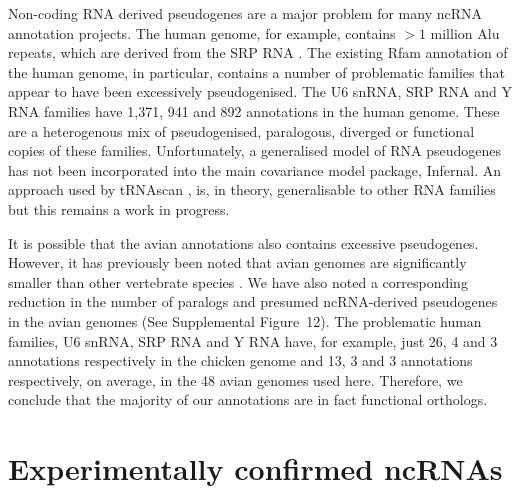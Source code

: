 \documentclass[10pt]{bmc_article}
\newenvironment{bmcformat}{\begin{raggedright}\baselineskip20pt\sloppy\setboolean{publ}{false}}{\end{raggedright}\baselineskip20pt\sloppy}
\begin{document}
\begin{bmcformat}

Non-coding RNA derived pseudogenes are a major problem for many ncRNA
annotation projects. The human genome, for example, contains $>1$
million Alu repeats, which are derived from the SRP RNA
\cite{Wheeler:2013}. The existing Rfam annotation of the human genome,
in particular, contains a number of problematic families that appear
to have been excessively pseudogenised. The U6 snRNA, SRP RNA and Y
RNA families have 1,371, 941 and 892 annotations in the human
genome. These are a heterogenous mix of pseudogenised, paralogous,
diverged or functional copies of these families. Unfortunately, a
generalised model of RNA pseudogenes has not been incorporated into
the main covariance model package, Infernal. An approach used by tRNAscan
\cite{Lowe:1997}, is, in theory, generalisable to other RNA families
but this remains a work in progress. 

It is possible that the avian annotations also contains excessive
pseudogenes. However, it has previously been noted that avian genomes
are significantly smaller than other vertebrate species
\cite{International_Chicken_Genome_Sequencing_Consortium:2004}. We
have also noted a corresponding reduction in the number of paralogs
and presumed ncRNA-derived pseudogenes in the avian genomes (See
Supplemental Figure~12). The problematic human families, U6 snRNA, SRP
RNA and Y RNA have, for example, just 26, 4 and 3 annotations
respectively in the chicken genome and 13, 3 and 3 annotations
respectively, on average, in the 48 avian genomes used here.
Therefore, we conclude that the majority of our annotations are in fact
functional orthologs.

\section*{Experimentally confirmed ncRNAs}


\end{bmcformat}
\end{document}
